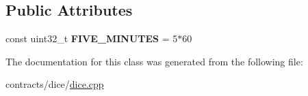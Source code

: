 \subsection*{Public Attributes}
\begin{DoxyCompactItemize}
\item 
\mbox{\label{classdice_ad7c3524f00c34c786834f896110e0419}} 
const uint32\+\_\+t {\bfseries F\+I\+V\+E\+\_\+\+M\+I\+N\+U\+T\+ES} = 5$\ast$60
\end{DoxyCompactItemize}


The documentation for this class was generated from the following file\+:\begin{DoxyCompactItemize}
\item 
contracts/dice/\mbox{\hyperlink{dice_8cpp}{dice.\+cpp}}\end{DoxyCompactItemize}
